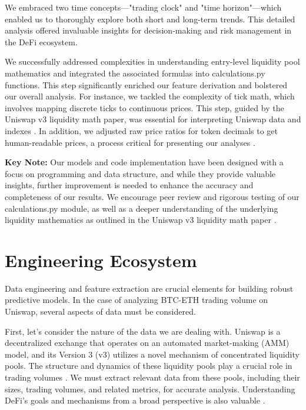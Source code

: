 \documentclass{article}
\begin{document}
We embraced two time concepts—"trading clock" and "time horizon"—which enabled us to thoroughly explore both short and long-term trends. This detailed analysis offered invaluable insights for decision-making and risk management in the DeFi ecosystem\cite{Miori2022}.

We successfully addressed complexities in understanding entry-level liquidity pool mathematics and integrated the associated formulas into calculations.py functions. This step significantly enriched our feature derivation and bolstered our overall analysis\cite{Elsts2021,Aigner2021}.
For instance, we tackled the complexity of tick math, which involves mapping discrete ticks to continuous prices. This step, guided by the Uniswap v3 liquidity math paper, was essential for interpreting Uniswap data and indexes \cite{Elsts2021}. In addition, we adjusted raw price ratios for token decimals to get human-readable prices, a process critical for presenting our analyses \cite{Elsts2021}.

\textbf{Key Note:} Our models and code implementation have been designed with a focus on programming and data structure, and while they provide valuable insights, further improvement is needed to enhance the accuracy and completeness of our results. We encourage peer review and rigorous testing of our calculations.py module, as well as a deeper understanding of the underlying liquidity mathematics as outlined in the Uniswap v3 liquidity math paper \cite{Elsts2021,Miori2023}.

\section{\textbf{Engineering Ecosystem}}

Data engineering and feature extraction are crucial elements for building robust predictive models. In the case of analyzing BTC-ETH trading volume on Uniswap, several aspects of data must be considered.

First, let's consider the nature of the data we are dealing with. Uniswap is a decentralized exchange that operates on an automated market-making (AMM) model, and its Version 3 (v3) utilizes a novel mechanism of concentrated liquidity pools. The structure and dynamics of these liquidity pools play a crucial role in trading volumes \cite{Miori2023}. We must extract relevant data from these pools, including their sizes, trading volumes, and related metrics, for accurate analysis. Understanding DeFi's goals and mechanisms from a broad perspective is also valuable \cite{Makarov2022}.
\end{document}
